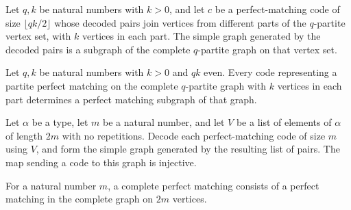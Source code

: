 \begin{theorem}
\label{FABL.pairListGraph_decodedBookPartiteEdges_le}
\leanok
{}
Let $q,k$ be natural numbers with $k>0$, and let $c$ be a perfect-matching code of size
$\lfloor qk/2\rfloor$ whose decoded pairs join vertices from different parts of the
$q$-partite vertex set, with $k$ vertices in each part. The simple graph generated by
the decoded pairs is a subgraph of the complete $q$-partite graph on that vertex set.
\end{theorem}

\begin{definition}
\label{FABL.partiteMatchingGraphOfCode}
\leanok
{}
Let $q,k$ be natural numbers with $k>0$ and $qk$ even. Every code representing a partite
perfect matching on the complete $q$-partite graph with $k$ vertices in each part
determines a perfect matching subgraph of that graph.
\end{definition}

\begin{theorem}
\label{FABL.pairListGraph_decodePerfectMatchingCode_injective}
\leanok
{}
Let $\alpha$ be a type, let $m$ be a natural number, and let $V$ be a list of elements
of $\alpha$ of length $2m$ with no repetitions. Decode each perfect-matching code of
size $m$ using $V$, and form the simple graph generated by the resulting list of pairs.
The map sending a code to this graph is injective.
\end{theorem}

\begin{definition}
\label{FABL.CompletePerfectMatching}
\leanok
For a natural number $m$, a complete perfect matching consists of a perfect matching in
the complete graph on $2m$ vertices.
\end{definition}


